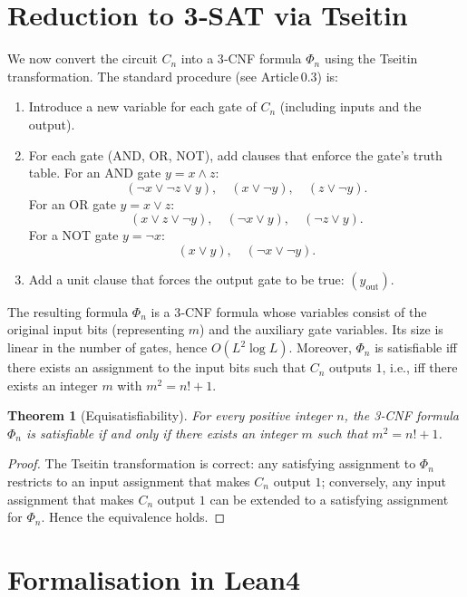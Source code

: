 \documentclass[11pt,a4paper]{article}
\newtheorem{theorem}{Theorem}[section]
\begin{document}
\section{Reduction to 3‑SAT via Tseitin}

We now convert the circuit $C_n$ into a 3‑CNF formula $\Phi_n$ using the Tseitin transformation. The standard procedure (see Article 0.3) is:

\begin{enumerate}
\item Introduce a new variable for each gate of $C_n$ (including inputs and the output).
\item For each gate (AND, OR, NOT), add clauses that enforce the gate’s truth table. For an AND gate $y = x \land z$:
   \[
   (\neg x \lor \neg z \lor y),\quad (x \lor \neg y),\quad (z \lor \neg y).
   \]
   For an OR gate $y = x \lor z$:
   \[
   (x \lor z \lor \neg y),\quad (\neg x \lor y),\quad (\neg z \lor y).
   \]
   For a NOT gate $y = \neg x$:
   \[
   (x \lor y),\quad (\neg x \lor \neg y).
   \]
\item Add a unit clause that forces the output gate to be true: $(y_{\text{out}})$.
\end{enumerate}

The resulting formula $\Phi_n$ is a 3‑CNF formula whose variables consist of the original input bits (representing $m$) and the auxiliary gate variables. Its size is linear in the number of gates, hence $O(L^2 \log L)$. Moreover, $\Phi_n$ is satisfiable iff there exists an assignment to the input bits such that $C_n$ outputs $1$, i.e., iff there exists an integer $m$ with $m^2 = n!+1$.

\begin{theorem}[Equisatisfiability]
\label{thm:equiv}
For every positive integer $n$, the 3‑CNF formula $\Phi_n$ is satisfiable if and only if there exists an integer $m$ such that $m^2 = n! + 1$.
\end{theorem}
\begin{proof}
The Tseitin transformation is correct: any satisfying assignment to $\Phi_n$ restricts to an input assignment that makes $C_n$ output $1$; conversely, any input assignment that makes $C_n$ output $1$ can be extended to a satisfying assignment for $\Phi_n$. Hence the equivalence holds.
\end{proof}

\section{Formalisation in Lean4}
\end{document}
